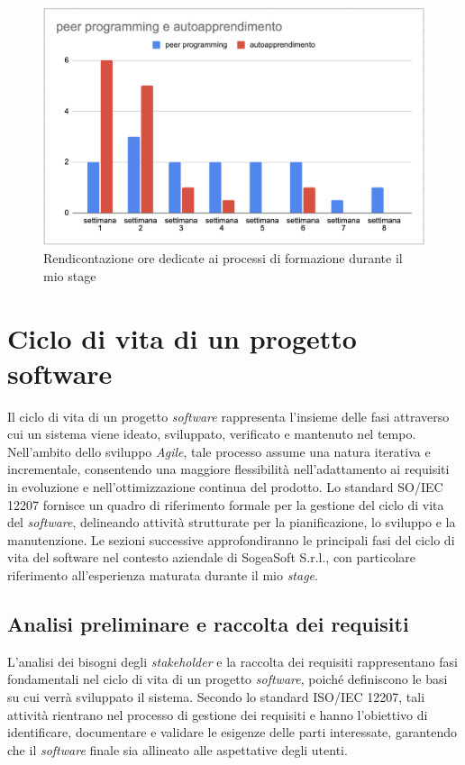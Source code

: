         \begin{figure} [H]
            \centering
            \includegraphics[width=0.8\linewidth]{BCS-Tessi/images/Ore_formazione.png}
            \caption{Rendicontazione ore dedicate ai processi di formazione durante il mio stage}
            \label{fig:Ore-formazione}
        \end{figure}
        

    \section{Ciclo di vita di un progetto software}
    Il ciclo di vita di un progetto \textit{software} rappresenta l’insieme delle fasi attraverso cui un sistema viene ideato, sviluppato, verificato e mantenuto nel tempo. Nell’ambito dello sviluppo \textit{Agile}, tale processo assume una natura iterativa e incrementale, consentendo una maggiore flessibilità nell’adattamento ai requisiti in evoluzione e nell’ottimizzazione continua del prodotto. Lo standard SO/IEC 12207 fornisce un quadro di riferimento formale per la gestione del ciclo di vita del \textit{software}, delineando attività strutturate per la pianificazione, lo sviluppo e la manutenzione. Le sezioni successive approfondiranno le principali fasi del ciclo di vita del software nel contesto aziendale di SogeaSoft S.r.l., con particolare riferimento all’esperienza maturata durante il mio \textit{stage}.
        \subsection{Analisi preliminare e raccolta dei requisiti}
        L’analisi dei bisogni degli \textit{stakeholder} e la raccolta dei requisiti rappresentano fasi fondamentali nel ciclo di vita di un progetto \textit{software}, poiché definiscono le basi su cui verrà sviluppato il sistema. Secondo lo standard ISO/IEC 12207, tali attività rientrano nel processo di gestione dei requisiti e hanno l’obiettivo di identificare, documentare e validare le esigenze delle parti interessate, garantendo che il \textit{software} finale sia allineato alle aspettative degli utenti. 

